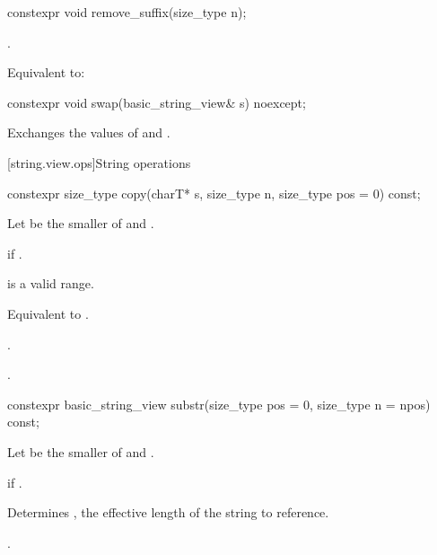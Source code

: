 %
\begin{itemdecl}
constexpr void remove_suffix(size_type n);
\end{itemdecl}

\begin{itemdescr}
\pnum
\expects
{}.

\pnum
\effects
Equivalent to: 
\end{itemdescr}

%
\begin{itemdecl}
constexpr void swap(basic_string_view& s) noexcept;
\end{itemdecl}

\begin{itemdescr}
\pnum
\effects
Exchanges the values of  and .
\end{itemdescr}

[string.view.ops]{String operations}

%
\begin{itemdecl}
constexpr size_type copy(charT* s, size_type n, size_type pos = 0) const;
\end{itemdecl}

\begin{itemdescr}
\pnum
Let  be the smaller of  and .

\pnum
\throws
{} if .

\pnum
\expects
{} is a valid range.

\pnum
\effects
Equivalent to .

\pnum
\returns
{}.

\pnum
\complexity
{}.
\end{itemdescr}

%
\begin{itemdecl}
constexpr basic_string_view substr(size_type pos = 0, size_type n = npos) const;
\end{itemdecl}

\begin{itemdescr}
\pnum
Let  be the smaller of  and .

\pnum
\throws
{} if .

\pnum
\effects
Determines , the effective length of the string to reference.

\pnum
\returns
{}.
\end{itemdescr}

